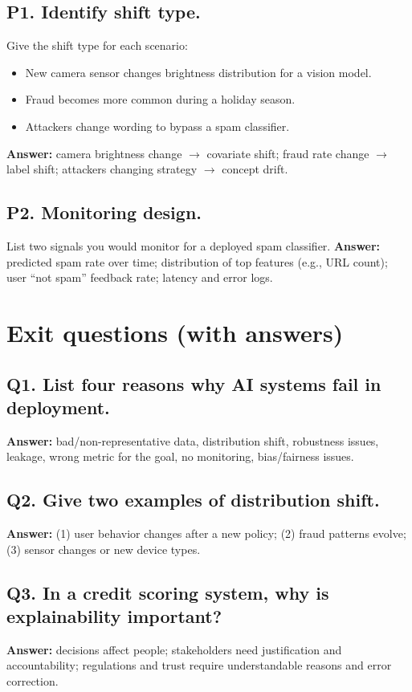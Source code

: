 \documentclass[11pt]{article}
\begin{document}
\subsection*{P1. Identify shift type.}
Give the shift type for each scenario:
\begin{itemize}[leftmargin=*]
  \item New camera sensor changes brightness distribution for a vision model.
  \item Fraud becomes more common during a holiday season.
  \item Attackers change wording to bypass a spam classifier.
\end{itemize}
\textbf{Answer:} camera brightness change $\rightarrow$ covariate shift; fraud rate change $\rightarrow$ label shift; attackers changing strategy $\rightarrow$ concept drift.

\subsection*{P2. Monitoring design.}
List two signals you would monitor for a deployed spam classifier.
\textbf{Answer:} predicted spam rate over time; distribution of top features (e.g., URL count); user ``not spam'' feedback rate; latency and error logs.

\section{Exit questions (with answers)}

\subsection*{Q1. List four reasons why AI systems fail in deployment.}
\textbf{Answer:} bad/non-representative data, distribution shift, robustness issues, leakage, wrong metric for the goal, no monitoring, bias/fairness issues.

\subsection*{Q2. Give two examples of distribution shift.}
\textbf{Answer:} (1) user behavior changes after a new policy; (2) fraud patterns evolve; (3) sensor changes or new device types.

\subsection*{Q3. In a credit scoring system, why is explainability important?}
\textbf{Answer:} decisions affect people; stakeholders need justification and accountability; regulations and trust require understandable reasons and error correction.
\end{document}
